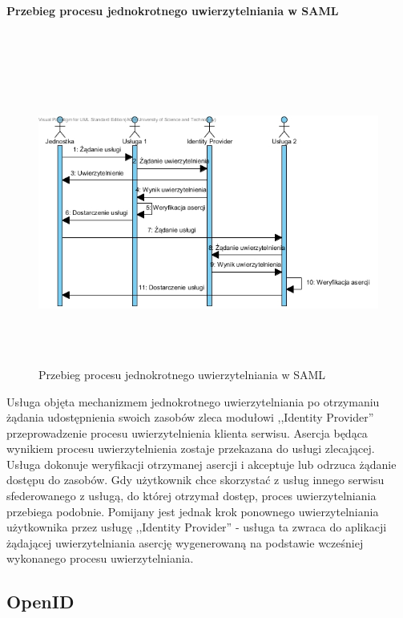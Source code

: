 		\paragraph{Przebieg procesu jednokrotnego uwierzytelniania w SAML}\mbox{}\\

			\begin{figure}[h]
				\centering
					\includegraphics[width=15cm,height=10cm]{img/ssoSteps.jpg}
				\caption{Przebieg procesu jednokrotnego uwierzytelniania w SAML}
				\label{Przebieg procesu jednokrotnego uwierzytelniania w SAML}
			\end{figure}

			Usługa objęta mechanizmem jednokrotnego uwierzytelniania po otrzymaniu żądania udostępnienia swoich zasobów zleca modułowi ,,Identity Provider'' przeprowadzenie procesu uwierzytelnienia klienta serwisu. Asercja będąca wynikiem procesu uwierzytelnienia zostaje przekazana do usługi zlecającej. Usługa dokonuje weryfikacji otrzymanej asercji i akceptuje lub odrzuca żądanie dostępu do zasobów. Gdy użytkownik chce skorzystać z usług innego serwisu sfederowanego z usługą, do której otrzymał dostęp, proces uwierzytelniania przebiega podobnie. Pomijany jest jednak krok ponownego uwierzytelniania użytkownika przez usługę ,,Identity Provider'' - usługa ta zwraca do aplikacji żądającej uwierzytelniania asercję wygenerowaną na podstawie wcześniej wykonanego procesu uwierzytelniania.	
			
\subsection{OpenID}

